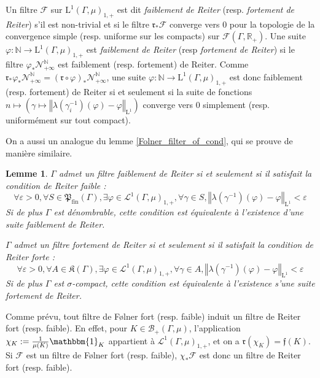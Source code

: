 \documentclass[a4paper,12pt]{article}
\newtheorem{lemma}[theorem]{Lemme}
\newcommand{\R}{\mathbb{R}}
\newcommand{\N}{\mathbb{N}}
\newcommand{\Bor}{\mathcal{B}}
\newcommand{\norm}[1]{\left\Vert #1\right\Vert}
\newcommand{\indic}{\mathbbm{1}}
\newcommand{\ssi}{si et seulement si }
\newcommand{\inv}{^{-1}}
\newcommand{\comp}{\circ}
\newcommand{\nhds}{\mathcal{N}}
\newcommand{\finparts}{\mathfrak{P}_{\mathrm{fin}}}
\begin{document}
Un filtre $\mathscr{F}$ sur $\mathrm{L}^1(\Gamma, \mu)_{1, +}$ est dit \emph{faiblement de Reiter} (resp. \emph{fortement de Reiter}) s'il est non-trivial et si le filtre $\mathfrak{r}_*\mathscr{F}$ converge vers $0$ pour la 
topologie de la convergence simple (resp. uniforme sur les compacts) sur $\mathcal{F}(\Gamma, \R_+)$. 
Une suite $\varphi:\N\to\mathrm{L}^1(\Gamma, \mu)_{1, +}$ est \emph{faiblement de Reiter} (resp \emph{fortement de Reiter}) si le filtre $\varphi_*\nhds_{+\infty}^\N$ est faiblement (resp. fortement) de Reiter. Comme $\mathfrak{r}_*\varphi_*\nhds_{+\infty}^\N = (\mathfrak{r}\comp \varphi)_*\nhds_{+\infty}^\N$,
une suite $\varphi:\N\to\mathrm{L}^1(\Gamma, \mu)_{1, +}$ est donc faiblement (resp. fortement) de Reiter \ssi la suite de fonctions
$n\mapsto\left(\gamma\mapsto\norm{\lambda(\gamma_i\inv)(\varphi)-\varphi}_{\mathrm{L}^1}\right)$ converge vers $0$ simplement 
(resp. uniformément sur tout compact).

On a aussi un analogue du lemme \ref{Folner_filter_of_cond}, qui se prouve de manière similaire.

\begin{lemma}\label{Reiter_filter_of_cond}
    $\Gamma$ admet un filtre faiblement de Reiter \ssi il satisfait la 
    \emph{condition de Reiter faible} :
    \begin{equation}\label{weak_Reiter_cond}\tag{WR}
        \forall\varepsilon>0, \forall S\in\finparts(\Gamma), \exists \varphi\in\mathscr{L}^1(\Gamma, \mu)_{1,+}, \forall \gamma\in S,
        \norm{\lambda(\gamma\inv)(\varphi)-\varphi}_{\mathrm{L}^1}<\varepsilon
    \end{equation}
    Si de plus $\Gamma$ est dénombrable, cette condition est équivalente à l'existence d'une \emph{suite} faiblement de Reiter.

    $\Gamma$ admet un filtre fortement de Reiter \ssi il satisfait la \emph{condition de Reiter forte} : 
    \begin{equation}\label{strong_Reiter_cond}\tag{SR}
        \forall\varepsilon>0, \forall A\in\mathfrak{K}(\Gamma), \exists\varphi\in\mathscr{L}^1(\Gamma, \mu)_{1,+}, \forall\gamma\in A, 
        \norm{\lambda(\gamma\inv)(\varphi)-\varphi}_{\mathrm{L}^1}<\varepsilon
    \end{equation}
    Si de plus $\Gamma$ est $\sigma$-compact, cette condition est équivalente à l'existence s'une \emph{suite} fortement de Reiter.
\end{lemma}

Comme prévu, tout filtre de F\o{}lner fort (resp. faible) induit un filtre de Reiter fort (resp. faible). En effet, pour $K\in\Bor_+(\Gamma, \mu)$, l'application 
$\chi_K:=\frac1{\mu(K)}\indic_K$ appartient à $\mathscr{L}^1(\Gamma, \mu)_{1,+}$, et on a $\mathfrak{r}(\chi_K) = \mathfrak{f}(K)$.
Si $\mathscr{F}$ est un filtre de F\o{}lner fort (resp. faible), $\chi_*\mathscr{F}$ est donc un filtre de Reiter fort (resp. faible).
\end{document}

